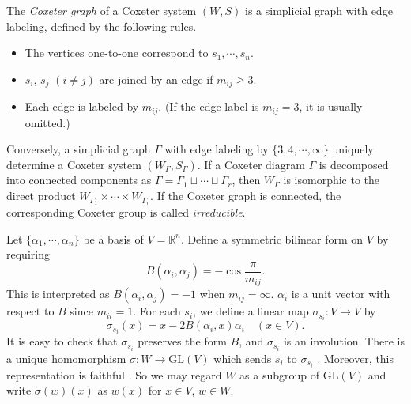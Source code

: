 \documentclass{amsart}
\newtheorem{proposition}[theorem]{Proposition}
\theoremstyle{definition}
\theoremstyle{remark}
\numberwithin{equation}{section}
\begin{document}
The \emph{Coxeter graph} of a Coxeter system $(W, S)$ 
is a simplicial graph with edge labeling,  
defined by the following rules.
\begin{itemize}
\item The vertices one-to-one correspond to $s_1, \cdots , s_n$.
\item $s_i$, $s_j$ $(i \neq j)$ are joined by an edge if $m_{ij} \geq 3$. 
\item Each edge is labeled by $m_{ij}$. 
(If the edge label is $m_{ij} = 3$, it is usually omitted.)
\end{itemize}
Conversely, a simplicial graph $\Gamma$ with edge labeling 
by $\{ 3, 4, \cdots , \infty\}$ uniquely determine 
a Coxeter system $(W_{\Gamma}, S_{\Gamma})$.
If a Coxeter diagram $\Gamma$ is decomposed into 
connected components as $\Gamma = \Gamma_1 \sqcup \cdots \sqcup \Gamma_r$, 
then $W_{\Gamma}$ is isomorphic to the direct product 
$W_{\Gamma_1} \times \cdots \times W_{\Gamma_r}$.
If the Coxeter graph is connected, 
the corresponding Coxeter group is called \emph{irreducible}.

Let $\{ \alpha_1, \cdots, \alpha_n \}$ be a basis of $V = \mathbb{R}^n$.
Define a symmetric bilinear form on $V$ by requiring 
\begin{equation}
\label{eq:symmetric_bilinear_form}
B(\alpha_i, \alpha_j) = - \cos \frac{\pi}{m_{ij}}.
\end{equation}
This is interpreted as $B(\alpha_i, \alpha_j) = -1$ when $m_{ij} = \infty$.
$\alpha_i$ is a unit vector with respect to $B$ since $m_{ii} = 1$.
For each $s_i$, we define a linear map $\sigma_{s_i} : V \to V$ by 
\[
\sigma_{s_i} (x) = x - 2 B(\alpha_{i}, x) \alpha_{i} \quad (x \in V).
\] 
It is easy to check that $\sigma_{s_i}$ preserves the form $B$, 
and $\sigma_{s_i}$ is an involution.
There is a unique homomorphism 
$\sigma : W \to \mathrm{GL}(V)$ which sends $s_i$ to $\sigma_{s_i}$
\cite[Proposition 5.3]{Humphreys}.
Moreover, this representation is faithful \cite[Corollary 5.4]{Humphreys}.
So we may regard $W$ as a subgroup of $\mathrm{GL}(V)$ 
and write $\sigma(w) (x)$ as $w(x)$ for $x \in V$, $w \in W$. 
\end{document}
